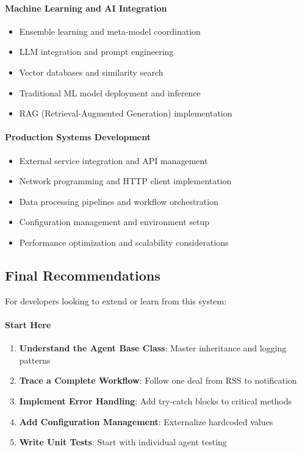 \paragraph{Machine Learning and AI Integration}
\begin{itemize}
\item Ensemble learning and meta-model coordination
\item LLM integration and prompt engineering
\item Vector databases and similarity search
\item Traditional ML model deployment and inference
\item RAG (Retrieval-Augmented Generation) implementation
\end{itemize}

\paragraph{Production Systems Development}
\begin{itemize}
\item External service integration and API management
\item Network programming and HTTP client implementation
\item Data processing pipelines and workflow orchestration
\item Configuration management and environment setup
\item Performance optimization and scalability considerations
\end{itemize}

\subsection{Final Recommendations}

For developers looking to extend or learn from this system:

\paragraph{Start Here \starfull\starfull\starfull\starfull\starfull}
\begin{enumerate}
\item \textbf{Understand the Agent Base Class}: Master inheritance and logging patterns
\item \textbf{Trace a Complete Workflow}: Follow one deal from RSS to notification
\item \textbf{Implement Error Handling}: Add try-catch blocks to critical methods
\item \textbf{Add Configuration Management}: Externalize hardcoded values
\item \textbf{Write Unit Tests}: Start with individual agent testing
\end{enumerate}

